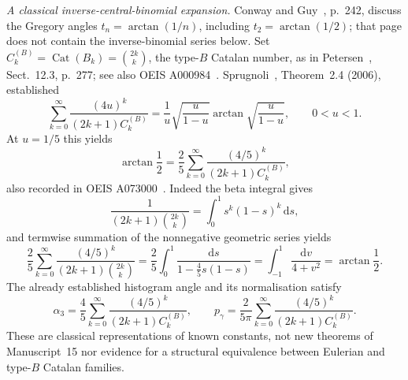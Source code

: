 \par\medskip\noindent\textit{A classical inverse-central-binomial expansion.}
Conway and Guy~\cite{conwayguy1996}, p.~242, discuss the Gregory angles
$t_n=\arctan(1/n)$, including $t_2=\arctan(1/2)$; that page does not
contain the inverse-binomial series below.
Set $C_k^{(B)}=\operatorname{Cat}(B_k)=\binom{2k}{k}$,
the type-$B$ Catalan number, as in Petersen~\cite{petersen2015},
Sect.~12.3, p.~277; see also OEIS A000984~\cite{oeis000984}.
Sprugnoli~\cite{sprugnoli2006}, Theorem~2.4 (2006), established
\[
 \sum_{k=0}^{\infty}\frac{(4u)^k}{(2k+1)C_k^{(B)}}=
 \frac1u\sqrt{\frac{u}{1-u}}\arctan\sqrt{\frac{u}{1-u}},
 \qquad 0<u<1.
\]
At $u=1/5$ this yields
\[
 \arctan\frac12=\frac25\sum_{k=0}^{\infty}
 \frac{(4/5)^k}{(2k+1)C_k^{(B)}},
\]
also recorded in OEIS A073000~\cite{oeis073000}.
Indeed the beta integral gives
\[
 \frac1{(2k+1)\binom{2k}{k}}=
 \int_0^1 s^k(1-s)^k\,\mathrm ds,
\]
and termwise summation of the nonnegative geometric series yields
\[
 \frac25\sum_{k=0}^{\infty}\frac{(4/5)^k}{(2k+1)\binom{2k}{k}}
 =\frac25\int_0^1\frac{\mathrm ds}{1-\tfrac45s(1-s)}
 =\int_{-1}^1\frac{\mathrm dv}{4+v^2}=\arctan\frac12.
\]
The already established histogram angle and its normalisation satisfy
\[
 \alpha_3=\frac45\sum_{k=0}^{\infty}
 \frac{(4/5)^k}{(2k+1)C_k^{(B)}},\qquad
 p_\gamma=\frac{2}{5\pi}\sum_{k=0}^{\infty}
 \frac{(4/5)^k}{(2k+1)C_k^{(B)}}.
\]
These are classical representations of known constants, not new
theorems of Manuscript~15 nor evidence for a structural equivalence
between Eulerian and type-$B$ Catalan families.

